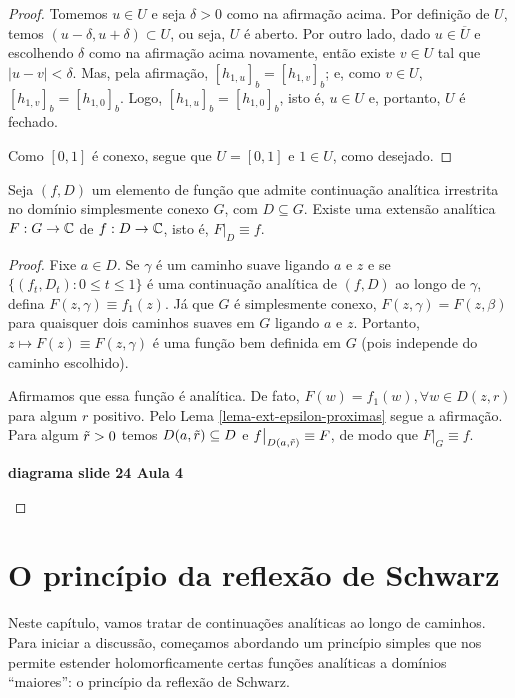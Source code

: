 \begin{proof}
        Tomemos $u\in U$ e seja $\delta > 0$ como na afirmação acima. Por definição de $U$,
        temos $(u-\delta, u+\delta) \subset U$, ou seja, $U$ é aberto. Por outro lado, dado
        $u\in\overline{U}$ e escolhendo $\delta$ como na afirmação acima novamente, então 
        existe $v\in U$ tal que $|u-v| < \delta$. Mas, pela afirmação, 
        $[h_{1,u}]_b = [h_{1,v}]_b$; e, como $v\in U$, $[h_{1,v}]_b = [h_{1,0}]_b$.
        Logo, $[h_{1,u}]_b = [h_{1,0}]_b$, isto é, $u\in U$ e, portanto, $U$ é fechado.
        
        Como $[0,1]$ é conexo, segue que $U = [0,1]$ e $1\in U$, como desejado.
    \end{proof}

    \begin{corolario}
        Seja $(f,D)$ um elemento de função que admite continuação analítica irrestrita no
        domínio simplesmente conexo $G$, com $D\subseteq G$. Existe uma extensão analítica
        $F:G\to\mathbb{C}$ de $f:D\to\mathbb{C}$, isto é, $F\big|_D \equiv f$.
    \end{corolario}

    \begin{proof}
        Fixe $a\in D$. Se $\gamma$ é um caminho suave ligando $a$ e $z$ e se 
        $\{ (f_t, D_t) : 0\leq t\leq 1 \}$ é uma continuação analítica de $(f,D)$ ao longo de
        $\gamma$, defina $F(z, \gamma) \equiv f_1(z)$. Já que $G$ é simplesmente conexo,
        $F(z, \gamma) = F(z,\beta)$ para quaisquer dois caminhos suaves em $G$ ligando $a$ e $z$.
        Portanto, $z\mapsto F(z)\equiv F(z, \gamma)$ é uma função bem definida em $G$ 
        (pois independe do caminho escolhido).
        
        Afirmamos que essa função é analítica. De fato, $F(w) = f_1(w), \forall w\in D(z,r)$
        para algum $r$ positivo. Pelo Lema \ref{lema-ext-epsilon-proximas} segue a afirmação.
        Para algum $\Tilde{r}>0$ temos $D(a, \Tilde{r}) \subseteq D$ e 
        $f\big|_{D(a, \Tilde{r})} \equiv F$, de modo que $F\big|_G \equiv f$.
        \begin{center}
            \textbf{diagrama slide 24 Aula 4}
        \end{center}
    \end{proof}
    
\section{O princípio da reflexão de Schwarz} %
\label{sec:Schwarz} %
    Neste capítulo, vamos tratar de continuações analíticas ao longo de caminhos.
    Para iniciar a discussão, começamos abordando um princípio simples que nos permite
    estender holomorficamente certas funções analíticas a domínios ``maiores'': 
    o princípio da reflexão de Schwarz.
    
